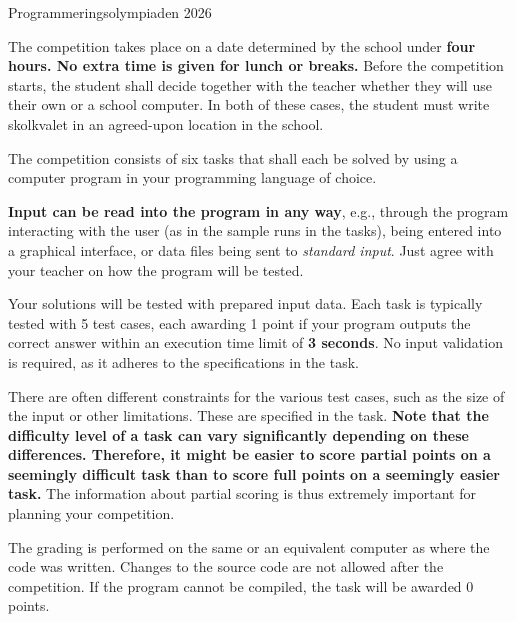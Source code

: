 

\thispagestyle{fancy}
\lstset{basicstyle=\ttfamily,
  breaklines=true}

\begin{center}
\Huge{Programmeringsolympiaden 2026}
\end{center}
\vspace{-1.2cm} 
\begin{lista}
\item The competition takes place on a date determined by the school under {\bf four hours.
    No extra time is given for lunch or breaks.} Before the competition starts, the student
    shall decide together with the teacher whether they will use their own or a school computer.
    In both of these cases, the student must write skolkvalet in an agreed-upon location
    in the school.
    
\item The competition consists of six tasks that shall each be solved by using a computer
  program in your programming language of choice.
\item {\bf Input can be read into the program in any way}, e.g., through the program interacting
with the user (as in the sample runs in the tasks), being entered into a graphical interface,
or data files being sent to {\em standard input}. Just agree with your teacher on how the program will be tested.
\item Your solutions will be tested with prepared input data. Each task is typically tested
with 5 test cases, each awarding 1 point if your program outputs the correct answer within
an execution time limit of {\bf 3 seconds}. No input validation is required, as it adheres
to the specifications in the task.
\item There are often different constraints for the various test cases, such as the size of
the input or other limitations. These are specified in the task. {\bf Note that the difficulty
level of a task can vary significantly depending on these differences. Therefore, it might
be easier to score partial points on a seemingly difficult task than to score full points
on a seemingly easier task.} The information about partial scoring is thus extremely
important for planning your competition.
\item The grading is performed on the same or an equivalent computer as where the code was written.
Changes to the source code are not allowed after the competition. If the program cannot be
compiled, the task will be awarded 0 points.


\end{lista}
